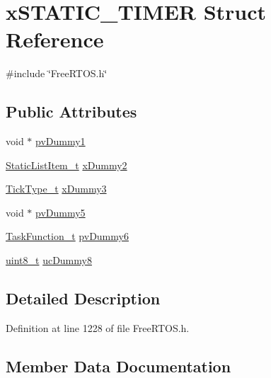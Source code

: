 \hypertarget{structxSTATIC__TIMER}{}\section{x\+S\+T\+A\+T\+I\+C\+\_\+\+T\+I\+M\+ER Struct Reference}
\label{structxSTATIC__TIMER}


{\ttfamily \#include \char`\"{}Free\+R\+T\+O\+S.\+h\char`\"{}}

\subsection*{Public Attributes}
\begin{DoxyCompactItemize}
\item 
void $\ast$ \hyperlink{structxSTATIC__TIMER_a040499298faced6032f84f3a33c785fd}{pv\+Dummy1}
\item 
\hyperlink{FreeRTOS_8h_a1d31bc0472385a87424518da484d9e09}{Static\+List\+Item\+\_\+t} \hyperlink{structxSTATIC__TIMER_a622e2e596e5829c9197bb44b9009474f}{x\+Dummy2}
\item 
\hyperlink{pic32mx_2portmacro_8h_aa69c48c6e902ce54f70886e6573c92a9}{Tick\+Type\+\_\+t} \hyperlink{structxSTATIC__TIMER_a60d582d1d0b5b9b15e8050d5ae29bc30}{x\+Dummy3}
\item 
void $\ast$ \hyperlink{structxSTATIC__TIMER_a5150821e9535f86547aafbfc50d44423}{pv\+Dummy5}
\item 
\hyperlink{projdefs_8h_a9b32502ff92c255c686dacde53c1cba0}{Task\+Function\+\_\+t} \hyperlink{structxSTATIC__TIMER_ac0d22064153fd2394380a61528d3c705}{pv\+Dummy6}
\item 
\hyperlink{stdint_8h_aba7bc1797add20fe3efdf37ced1182c5}{uint8\+\_\+t} \hyperlink{structxSTATIC__TIMER_a36a702a7e0e2fec558c8264ff3d88e93}{uc\+Dummy8}
\end{DoxyCompactItemize}


\subsection{Detailed Description}


Definition at line 1228 of file Free\+R\+T\+O\+S.\+h.



\subsection{Member Data Documentation}
\mbox{\label{structxSTATIC__TIMER_a040499298faced6032f84f3a33c785fd}} 
